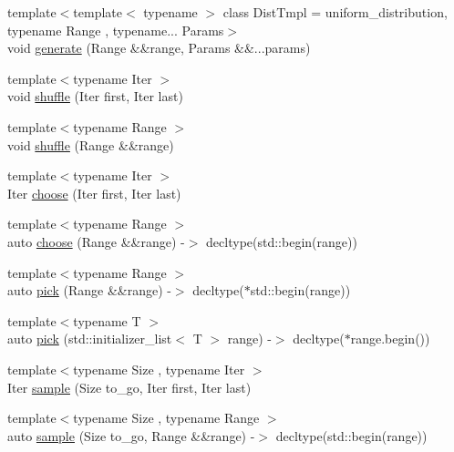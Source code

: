 \begin{DoxyCompactItemize}
\item 
{\footnotesize template$<$template$<$ typename $>$ class Dist\+Tmpl = uniform\+\_\+distribution, typename Range , typename... Params$>$ }\\void \hyperlink{classrandutils_1_1random__generator_ae061f844df411efc2ebfe6c3bbc6f206}{generate} (Range \&\&range, Params \&\&...params)
\item 
{\footnotesize template$<$typename Iter $>$ }\\void \hyperlink{classrandutils_1_1random__generator_aaa2790b3799d1a62d489ae3efefbb006}{shuffle} (Iter first, Iter last)
\item 
{\footnotesize template$<$typename Range $>$ }\\void \hyperlink{classrandutils_1_1random__generator_a96bd60aadafa23dc853dcd9414f26b69}{shuffle} (Range \&\&range)
\item 
{\footnotesize template$<$typename Iter $>$ }\\Iter \hyperlink{classrandutils_1_1random__generator_a29f305cbca6d418d4c2ddbf60953dc42}{choose} (Iter first, Iter last)
\item 
{\footnotesize template$<$typename Range $>$ }\\auto \hyperlink{classrandutils_1_1random__generator_a0eafdcc64b6d0967d9668a0775628af6}{choose} (Range \&\&range) -\/$>$ decltype(std\+::begin(range))
\item 
{\footnotesize template$<$typename Range $>$ }\\auto \hyperlink{classrandutils_1_1random__generator_a6d9a9002b313cf8126bf640f728f3c49}{pick} (Range \&\&range) -\/$>$ decltype($\ast$std\+::begin(range))
\item 
{\footnotesize template$<$typename T $>$ }\\auto \hyperlink{classrandutils_1_1random__generator_aab0a1c9def1a609d5739eddf5ca8caeb}{pick} (std\+::initializer\+\_\+list$<$ T $>$ range) -\/$>$ decltype($\ast$range.\+begin())
\item 
{\footnotesize template$<$typename Size , typename Iter $>$ }\\Iter \hyperlink{classrandutils_1_1random__generator_a6572f276cd3c8fd547ffbefce5cd4dc4}{sample} (Size to\+\_\+go, Iter first, Iter last)
\item 
{\footnotesize template$<$typename Size , typename Range $>$ }\\auto \hyperlink{classrandutils_1_1random__generator_a1f99da2d77fccea01edc3a5fe32255ac}{sample} (Size to\+\_\+go, Range \&\&range) -\/$>$ decltype(std\+::begin(range))
\end{DoxyCompactItemize}


